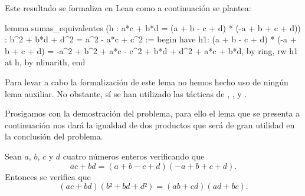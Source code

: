 Este resultado se formaliza en Lean como a continuación se plantea:
\begin{leancode}
lemma sumas_equivalentes
  (h : a*c + b*d = (a + b - c + d) * (-a + b + c + d))
  : b^2 + b*d + d^2 = a^2 - a*c + c^2 :=
begin
  have h1: (a + b - c + d) * (-a + b + c + d) =
           -a^2  + b^2  + a*c - c^2 + b*d + d^2 + a*c + b*d,
    by ring,
  rw h1 at h,
  by nlinarith,
end
\end{leancode}

Para levar a cabo la formalización de este lema no hemos hecho uso de
ningún lema auxiliar. No obstante, sí se han utilizado las tácticas de
,
,
 y
.

Prosigamos con la demostración del problema, para ello el lema que se
presenta a continuación nos dará la igualdad de dos productos que será
de gran utilidad en la conclusión del problema.

\begin{lema}\label{q601lemaprod}
    Sean \(a\), \(b\), \(c\) y \(d\) cuatro números enteros verificando que
    \begin{equation}\label{q601hipprod}\tag{h}
      ac+bd = (a+b-c+d)(-a+b+c+d).
    \end{equation}
    Entonces se verifica que
    \begin{equation}\label{q601objprod}
      (ac+bd)(b²+bd+d²) = (ab+cd)(ad+bc).
    \end{equation}
\end{lema}

